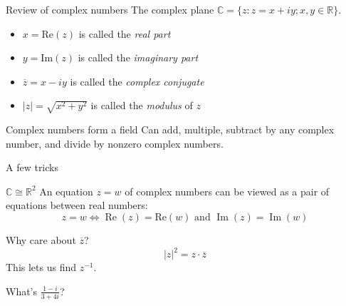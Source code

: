 \documentclass{beamer}
\newcommand{\C}{\mathbb{C}}
\newcommand{\R}{\mathbb{R}}
\DeclareMathOperator{\Real}{Re}
\DeclareMathOperator{\Imag}{Im}
\begin{document}
\begin{frame}{Review of complex numbers}
  The complex plane $\C=\{z: z=x+iy; x,y\in\R\}$.
  \begin{itemize}
  \item $x=\text{Re}(z)$ is called the \emph{real part} 
  \item $y=\text{Im}(z)$ is called the \emph{imaginary part} 
  \item $\overline{z}=x-iy$ is called the \emph{complex conjugate} 
  \item $|z|=\sqrt{x^2+y^2}$ is called the \emph{modulus} of $z$

  \end{itemize}
  \begin{block}{Complex numbers form a field}
Can add, multiple, subtract by any complex number, and divide by nonzero complex numbers.
\end{block}

\end{frame}

\begin{frame}{A few tricks}
  \begin{block}{$\C\cong\R^2$}
    An equation $z=w$ of complex numbers can be viewed as a pair of equations between real numbers:
$$z=w \iff  \Real(z)=\text{Re}(w) \text{ and } \Imag(z)=\Imag(w)$$
  \end{block}

  \begin{block}{Why care about $\overline{z}$?}
    $$|z|^2=z\cdot \overline{z}$$
    This lets us find $z^{-1}$.
\end{block}
  \begin{example}What's $\frac{1-i}{3+4i}$?

    \end{example}

\end{frame}
\end{document}

